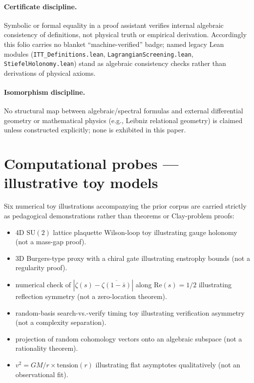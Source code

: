 \documentclass{alienfolio}
\begin{document}
\paragraph{Certificate discipline.}
Symbolic or formal equality in a proof assistant verifies internal
algebraic consistency of definitions, not physical truth or empirical
derivation. Accordingly this folio carries no blanket ``machine-verified''
badge; named legacy Lean modules (\texttt{ITT\_Definitions.lean},
\texttt{LagrangianScreening.lean}, \texttt{StiefelHolonomy.lean}) stand as
algebraic consistency checks rather than derivations of physical axioms.

\paragraph{Isomorphism discipline.}
No structural map between algebraic/spectral formulas and external
differential geometry or mathematical physics (e.g., Leibniz relational
geometry) is claimed unless constructed explicitly; none is exhibited in
this paper.

\section{Computational probes --- illustrative toy models}
\label{sec:probes}

Six numerical toy illustrations accompanying the prior corpus are
carried strictly as pedagogical demonstrations rather than theorems or
Clay-problem proofs:

\begin{itemize}
\item {} 4D $\mathrm{SU}(2)$ lattice plaquette
Wilson-loop toy illustrating gauge holonomy (not a mass-gap proof).
\item {} 3D Burgers-type proxy with a chiral
gate illustrating enstrophy bounds (not a regularity proof).
\item {} numerical check of
$|\zeta(s)-\overline{\zeta(1-\bar s)}|$ along $\mathrm{Re}(s)=1/2$
illustrating reflection symmetry (not a zero-location theorem).
\item {} random-basis search-vs.-verify timing toy
illustrating verification asymmetry (not a complexity separation).
\item {} projection of random cohomology vectors onto an
algebraic subspace (not a rationality theorem).
\item {} $v^2 = GM/r \times \mathrm{tension}(r)$
illustrating flat asymptotes qualitatively (not an observational fit).
\end{itemize}
\end{document}
